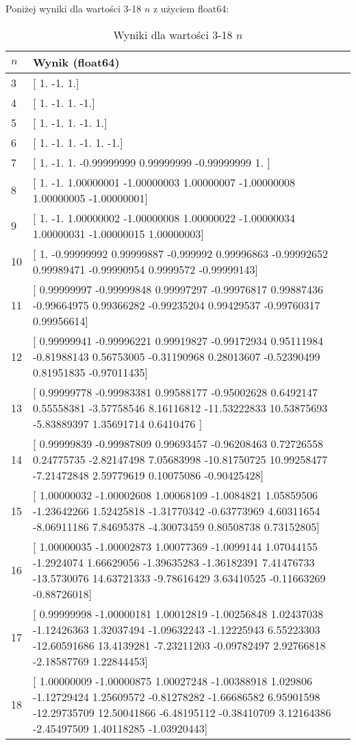 \documentclass{article}
\begin{document}
Poniżej wyniki dla wartości 3-18 $n$ z użyciem float64:
\begin{table}[H]
\centering
\begin{tabular}{|l|p{11cm}|}
\hline
$n$ & Wynik (float64)\\ \hline
3 & [ 1. -1.  1.] \\ \hline
4 & [ 1. -1.  1. -1.] \\ \hline
5 & [ 1. -1.  1. -1.  1.] \\ \hline
6 & [ 1. -1.  1. -1.  1. -1.] \\ \hline
7 & [ 1.     -1.      1.     -0.99999999  0.99999999 -0.99999999  1. ] \\ \hline
8 & [ 1.         -1.          1.00000001 -1.00000003  1.00000007 -1.00000008 1.00000005 -1.00000001] \\ \hline
9 & [ 1.         -1.          1.00000002 -1.00000008  1.00000022 -1.00000034 1.00000031 -1.00000015  1.00000003] \\ \hline
10 & [ 1.         -0.99999992  0.99999887 -0.999992    0.99996863 -0.99992652 0.99989471 -0.99990954  0.9999572  -0.99999143] \\ \hline
11 & [ 0.99999997 -0.99999848  0.99997297 -0.99976817  0.99887436 -0.99664975 0.99366282 -0.99235204  0.99429537 -0.99760317  0.99956614] \\ \hline
12 & [ 0.99999941 -0.99996221  0.99919827 -0.99172934  0.95111984 -0.81988143 0.56753005 -0.31190968  0.28013607 -0.52390499  0.81951835 -0.97011435] \\ \hline
13 & [  0.99999778  -0.99983381   0.99588177  -0.95002628   0.6492147
0.55558381  -3.57758546   8.16116812 -11.53222833  10.53875693
-5.83889397   1.35691714   0.6410476 ] \\ \hline
14 & [  0.99999839  -0.99987809   0.99693457  -0.96208463   0.72726558
0.24775735  -2.82147498   7.05683998 -10.81750725  10.99258477
-7.21472848   2.59779619   0.10075086  -0.90425428] \\ \hline
15 & [ 1.00000032 -1.00002608  1.00068109 -1.0084821   1.05859506 -1.23642266
1.52425818 -1.31770342 -0.63773969  4.60311654 -8.06911186  7.84695378
-4.30073459  0.80508738  0.73152805] \\ \hline
16 & [  1.00000035  -1.00002873   1.00077369  -1.0099144    1.07044155
-1.2924074    1.66629056  -1.39635283  -1.36182391   7.41476733
-13.5730076   14.63721333  -9.78616429   3.63410525  -0.11663269
-0.88726018] \\ \hline
17 & [  0.99999998  -1.00000181   1.00012819  -1.00256848   1.02437038
-1.12426363   1.32037494  -1.09632243  -1.12225943   6.55223303
-12.60591686  13.4139281   -7.23211203  -0.09782497   2.92766818
-2.18587769   1.22844453] \\ \hline
18 & [  1.00000009  -1.00000875   1.00027248  -1.00388918   1.029806
  -1.12729424   1.25609572  -0.81278282  -1.66686582   6.95901598
 -12.29735709  12.50041866  -6.48195112  -0.38410709   3.12164386
  -2.45497509   1.40118285  -1.03920443] \\ \hline
\end{tabular}
\caption{Wyniki dla wartości 3-18 $n$}
\end{table}
\end{document}
